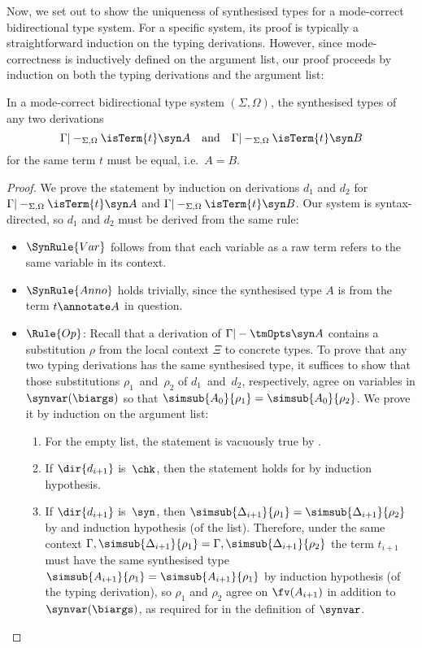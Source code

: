 Now, we set out to show the uniqueness of synthesised types for a mode-correct bidirectional type system.
For a specific system, its proof is typically a straightforward induction on the typing derivations.
However, since mode-correctness is inductively defined on the argument list, our proof proceeds by induction on both the typing derivations and the argument list:
\begin{lemma}\label{thm:unique-syn}
  In a mode-correct bidirectional type system $(\Sigma, \Omega)$, the synthesised types of any two derivations
  \[
    \Gamma |-_{\Sigma, \Omega} \isTerm{t} \syn A
    \quad\text{and}\quad
    \Gamma |-_{\Sigma, \Omega} \isTerm{t} \syn B
  \]
  for the same term $t$ must be equal, i.e.\ $A = B$.
\end{lemma}
\begin{proof}%
  We prove the statement by induction on derivations $d_1$ and $d_2$ for $\Gamma |-_{\Sigma, \Omega} \isTerm{t} \syn A$ and $\Gamma |-_{\Sigma, \Omega} \isTerm{t} \syn B$.
  Our system is syntax-directed, so $d_1$ and $d_2$ must be derived from the same rule: 
  \begin{itemize}
    \item $\SynRule{Var}$ follows from that each variable as a raw term refers to the same variable in its context.
    \item $\SynRule{Anno}$ holds trivially, since the synthesised type $A$ is from the term $t \annotate A$ in question.
    \item $\Rule{Op}$: Recall that a derivation of\/ $\Gamma |- \tmOpts \syn A$ contains a substitution $\rho$ from the local context $\Xi$ to concrete types.
      To prove that any two typing derivations has the same synthesised type, it suffices to show that those substitutions $\rho_1$~and~$\rho_2$ of $d_1$~and~$d_2$, respectively, agree on variables in $\synvar(\biargs)$ so that $\simsub{A_0}{\rho_1} = \simsub{A_0}{\rho_2}$.
      We prove it by induction on the argument list:
      \begin{enumerate}
        \item For the empty list, the statement is vacuously true by .
        \item If $\dir{d_{i+1}}$ is~$\chk$, then the statement holds for  by induction hypothesis.
        \item If $\dir{d_{i+1}}$ is~$\syn$, then $\simsub{\Delta_{i+1}}{\rho_1} = \simsub{\Delta_{i+1}}{\rho_2}$ by  and induction hypothesis (of the list).
          Therefore, under the same context $\Gamma, \simsub{\Delta_{i+1}}{\rho_1} = \Gamma, \simsub{\Delta_{i+1}}{\rho_2}$ the term $t_{i+1}$ must have the same synthesised type $\simsub{A_{i+1}}{\rho_1} = \simsub{A_{i+1}}{\rho_1}$ by induction hypothesis (of the typing derivation), so $\rho_1$ and $\rho_2$ agree on $\fv(A_{i+1})$ in addition to $\synvar(\biargs)$, as required for  in the definition of $\synvar$.
      \end{enumerate}
  \end{itemize}
\end{proof}

